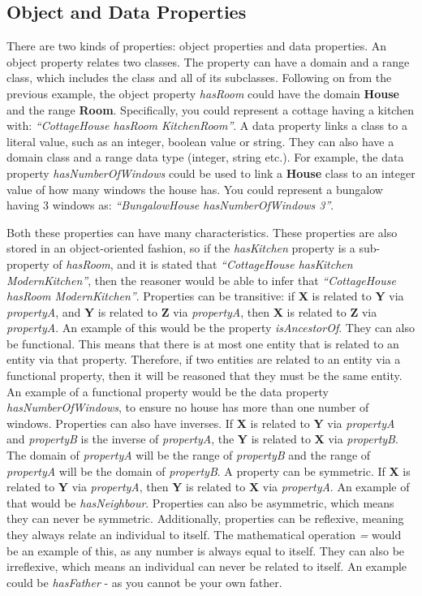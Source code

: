 \subsection{Object and Data Properties}

There are two kinds of properties: object properties and data properties. An object property relates two classes. The property can have a domain and a range class, which includes the class and all of its subclasses. Following on from the previous example, the object property \textit{hasRoom} could have the domain \textbf{House} and the range \textbf{Room}. Specifically, you could represent a cottage having a kitchen with: \textit{``CottageHouse hasRoom KitchenRoom''}. A data property links a class to a literal value, such as an integer, boolean value or string. They can also have a domain class and a range data type (integer, string etc.). For example, the data property \textit{hasNumberOfWindows} could be used to link a \textbf{House} class to an integer value of how many windows the house has. You could represent a bungalow having 3 windows as: \textit{``BungalowHouse hasNumberOfWindows 3''}. 

Both these properties can have many characteristics. These properties are also stored in an object-oriented fashion, so if the \textit{hasKitchen} property is a sub-property of \textit{hasRoom}, and it is stated that \textit{``CottageHouse hasKitchen ModernKitchen''}, then the reasoner would be able to infer that \textit{``CottageHouse hasRoom ModernKitchen''}. Properties can be transitive: if \textbf{X} is related to \textbf{Y} via \textit{propertyA}, and \textbf{Y} is related to \textbf{Z} via \textit{propertyA}, then \textbf{X} is related to \textbf{Z} via \textit{propertyA}. An example of this would be the property \textit{isAncestorOf}. They can also be functional. This means that there is at most one entity that is related to an entity via that property. Therefore, if two entities are related to an entity via a functional property, then it will be reasoned that they must be the same entity. An example of a functional property would be the data property \textit{hasNumberOfWindows}, to ensure no house has more than one number of windows. Properties can also have inverses. If \textbf{X} is related to \textbf{Y} via \textit{propertyA} and \textit{propertyB} is the inverse of \textit{propertyA}, the \textbf{Y} is related to \textbf{X} via \textit{propertyB}. The domain of \textit{propertyA} will be the range of \textit{propertyB} and the range of \textit{propertyA} will be the domain of \textit{propertyB}. A property can be symmetric. If \textbf{X} is related to \textbf{Y} via \textit{propertyA}, then \textbf{Y} is related to \textbf{X} via \textit{propertyA}. An example of that would be \textit{hasNeighbour}. Properties can also be asymmetric, which means they can never be symmetric. Additionally, properties can be reflexive, meaning they always relate an individual to itself. The mathematical operation \textit{=} would be an example of this, as any number is always equal to itself. They can also be irreflexive, which means an individual can never be related to itself. An example could be \textit{hasFather} - as you cannot be your own father.

